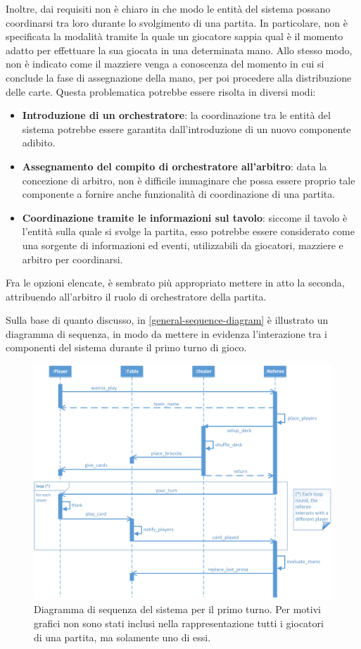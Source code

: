 \documentclass[a4paper,12pt]{article}
\begin{document}
Inoltre, dai requisiti non è chiaro in che modo le entità del sistema possano coordinarsi tra loro durante lo svolgimento di una partita. In particolare, non è specificata la modalità tramite la quale un giocatore sappia qual è il momento adatto per effettuare la sua giocata in una determinata mano. Allo stesso modo, non è indicato come il mazziere venga a conoscenza del momento in cui si conclude la fase di assegnazione della mano, per poi procedere alla distribuzione delle carte. Questa problematica potrebbe essere risolta in diversi modi:
\begin{itemize}
	\item \textbf{Introduzione di un orchestratore}: la coordinazione tra le entità del sistema potrebbe essere garantita dall'introduzione di un nuovo componente adibito.
	\item \textbf{Assegnamento del compito di orchestratore all'arbitro}: data la concezione di arbitro, non è difficile immaginare che possa essere proprio tale componente a fornire anche funzionalità di coordinazione di una partita.
	\item \textbf{Coordinazione tramite le informazioni sul tavolo}: siccome il tavolo è l'entità sulla quale si svolge la partita, esso potrebbe essere considerato come una sorgente di informazioni ed eventi, utilizzabili da giocatori, mazziere e arbitro per coordinarsi.
\end{itemize}
Fra le opzioni elencate, è sembrato più appropriato mettere in atto la seconda, attribuendo all'arbitro il ruolo di orchestratore della partita.

Sulla base di quanto discusso, in \autoref{general-sequence-diagram} è illustrato un diagramma di sequenza, in modo da mettere in evidenza l'interazione tra i componenti del sistema durante il primo turno di gioco.


\begin{figure}[H]
	\hspace*{-0.7in}
	\centering
	\includegraphics[width=180mm]{./img/general_sequence_diagram.png}
	\caption{Diagramma di sequenza del sistema per il primo turno. Per motivi grafici non sono stati inclusi nella rappresentazione tutti i giocatori di una partita, ma solamente uno di essi. \label{general-sequence-diagram}}
\end{figure}
\end{document}
